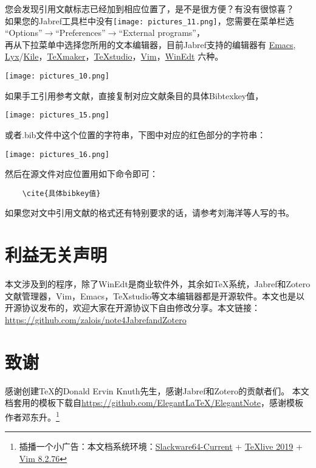\documentclass[cn,geye,cyan,normal,14pt]{elegantnote}
\begin{document}
您会发现引用文献标志已经加到相应位置了，是不是很方便？有没有很惊喜？\\
如果您的Jabref工具栏中没有\texttt{[image: pictures\_11.png]}，您需要在菜单栏选\\
``Options''$\to$``Preferences''$\to$``External programs''，\\
再从下拉菜单中选择您所用的文本编辑器，目前Jabref支持的编辑器有 \href{https://ftp.gnu.org/gnu/emacs/}{Emacs}, \href{https://www.lyx.org/}{Lyx}/\href{https://kile.sourceforge.io/}{Kile}，\href{https://www.xm1math.net/texmaker/}{\TeX maker}，\href{https://github.com/texstudio-org/texstudio/releases}{\TeX studio}，\href{https://github.com/vim/vim/releases}{Vim}，\href{http://www.winedt.com/}{WinEdt} 六种。
			\begin{center}
			\texttt{[image: pictures\_10.png]}
			\end{center}
\begin{note}
	如果手工引用参考文献，直接复制对应文献条目的具体Bibtexkey值，
			\begin{center}
			\texttt{[image: pictures\_15.png]}
			\end{center}
			或者.bib文件中这个位置的字符串，下图中对应的红色部分的字符串：
			\begin{center}
			\texttt{[image: pictures\_16.png]}
			\end{center}
	然后在源文件对应位置用如下命令即可：
	\begin{lstlisting}
	\cite{具体bibkey值}
	\end{lstlisting}
\end{note}
\begin{note}
	如果您对文中引用文献的格式还有特别要求的话，请参考刘海洋等人写的书\cite{胡伟2013LATEX,刘海洋2013LATEX,陈志杰2006LATEX}。
\end{note}

\section{利益无关声明}
本文涉及到的程序，除了WinEdt是商业软件外，其余如\TeX 系统，Jabref和Zotero文献管理器，Vim，Emacs，\TeX studio等文本编辑器都是开源软件。本文也是以开源协议发布的，欢迎大家在开源协议下自由修改分享。本文链接：\url{https://github.com/zalois/note4JabrefandZotero}
\section{致谢}
感谢创建\TeX 的Donald Ervin Knuth先生，感谢Jabref和Zotero的贡献者们。
本文档套用的模板下载自\href{https://github.com/ElegantLaTeX/ElegantNote}{https://github.com/Elegant\LaTeX/ElegantNote}，感谢模板作者邓东升。\footnote{插播一个小广告：本文档系统环境：\href{https://mirrors.slackware.com/slackware/slackware64-current/}{Slackware64-Current} + \href{https://www.tug.org/texlive/}{\TeX live 2019} + \href{https://www.vim.org/}{Vim 8.2.76}}
\nocite{*}
%

\end{document}

